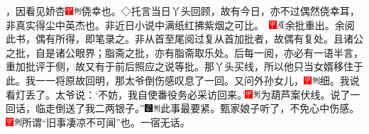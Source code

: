 {，因看见娇杏{\includegraphics[width=3mm]{../Images/00002}\includegraphics[width=3mm]{../Images/00011}\footnotesize \kaishu 侥幸也。◇托言当日丫头回顾，故有今日，亦不过偶然侥幸耳，非真实得尘中英杰也。非近日小说中满纸红拂紫烟之可比。　\includegraphics[width=3mm]{../Images/00002}\includegraphics[width=3mm]{../Images/00010}\footnotesize \kaishu 余批重出。余阅此书，偶有所得，即笔录之。非从首至尾阅过复从首加批者，故偶有复处。且诸公之批，自是诸公眼界；脂斋之批，亦有脂斋取乐处。后每一阅，亦必有一语半言，重加批评于侧，故又有于前后照应之说等批。}那丫头买线，所以他只当女婿移住于此。我一一将原故回明，那太爷倒伤感叹息了一回。又问外孙女儿，{\includegraphics[width=3mm]{../Images/00002}\includegraphics[width=3mm]{../Images/00011}\footnotesize \kaishu 细。}我说看灯丢了。太爷说：`不妨，我自使番役务必采访回来。'{\includegraphics[width=3mm]{../Images/00002}\includegraphics[width=3mm]{../Images/00011}\footnotesize \kaishu 为葫芦案伏线。}说了一回话，临走倒送了我二两银子。''{\includegraphics[width=3mm]{../Images/00006}\includegraphics[width=3mm]{../Images/00011}\footnotesize \kaishu 此事最要紧。}甄家娘子听了，不免心中伤感。{\includegraphics[width=3mm]{../Images/00002}\includegraphics[width=3mm]{../Images/00011}\footnotesize \kaishu 所谓``旧事凄凉不可闻''也。}一宿无话。

}
